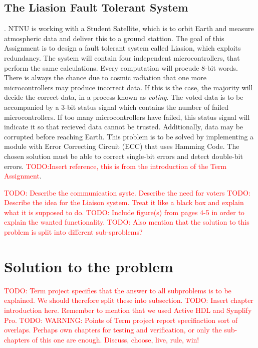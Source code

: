 \documentclass[a4paper]{IEEEtran}
\newcommand\TODO[1]{\textcolor{red}{TODO:#1}}
\newcommand\todo[1]{\TODO{#1}}
\begin{document}
\subsection{The Liasion Fault Tolerant System}.
NTNU is working with a Student Satellite, which is to orbit Earth and measure atmospheric data and deliver this to a ground stattion. The goal of this Assignment is to design a fault tolerant system called Liasion, which exploits redundancy. The system will contain four independent microcontrollers, that perform the same calculations. Every computation will procude 8-bit words. There is always the chance due to cosmic radiation that one more microcontrollers may produce incorrect data. If this is the case, the majority will decide the correct data, in a process known as \textit{voting}. The voted data is to be accompanied by a 3-bit status signal which contains the number of failed microcontrollers. If too many microcontrollers have failed, this status signal will indicate it so that recieved data cannot be trusted. Additionally, data may be corrupted before reaching Earth. This problem is to be solved by implementing a module with Error Correcting Circuit (ECC) that uses Hamming Code. The chosen solution must be able to correct single-bit errors and detect double-bit errors.
\break 
\TODO{Insert reference, this is from the introduction of the Term Assignment}. 

\todo{ Describe the communication syste. Describe the need for voters }
\break
\break
\todo{ Describe the idea for the Liaison system. Treat it like a black box and explain what it is supposed to do.}
\break
\break
\todo{ Include figure(s) from pages 4-5 in order to explain the wanted functionality. }
\break
\break
\todo{ Also mention that the solution to this problem is split into different sub-sproblems? }

\section{ Solution to the problem}
\todo{ Term project specifies that the answer to all subproblems is to be explained. We should therefore split these into subsection. }
\break
\break
\todo{ Insert chapter introduction here. Remember to mention that we used Active HDL and Synplify Pro.}
\break
\break
\todo{ WARNING: Points of Term project report specifiaction sort of overlaps. Perhaps own chapters for testing and verification, or only the sub-chapters of this one are enough. Discuss, choose, live, rule, win!} 
\end{document}
